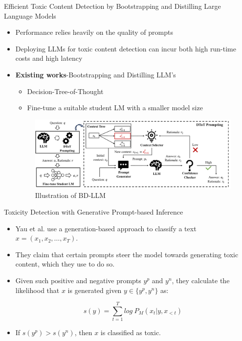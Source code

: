 \begin{frame}{Efficient Toxic Content Detection by Bootstrapping and Distilling Large Language Models}

  \begin{itemize}

  \item Performance relies heavily on the quality of prompts
  \item Deploying LLMs for toxic content detection can incur both high run-time costs and high latency 
  \item \textbf{Existing works}-Bootstrapping and Distilling LLM's
  \begin{itemize}
    \item Decision-Tree-of-Thought
    \item Fine-tune a suitable student LM with a smaller model size
  \end{itemize}
  \begin{figure}
    \centering
    \includegraphics[width=1\linewidth]{images/BD_LLM.png}
    \caption{Illustration of BD-LLM}
    \label{fig:1}
  \end{figure}

\end{itemize}
    
\end{frame}


\begin{frame}{Toxicity Detection with Generative Prompt-based Inference}

\begin{itemize}
  \item Yau et al. use a generation-based approach to classify a text $x = (x_1, x_2, \dots, x_T)$.
  \item They claim that certain prompts steer the model towards generating toxic content, which they use to do so.
  \item Given such positive and negative prompts $y^p$ and $y^n$, they calculate the likelihood that $x$ is generated given $y \in \{y^p, y^n\}$ as:

  \[ s(y) = \sum_{t = 1}^{T} log ~ P_M(x_t | y, x_{<t}) \]

  \item If $s(y^p) > s(y^n)$, then $x$ is classified as toxic.
\end{itemize}

\end{frame}
